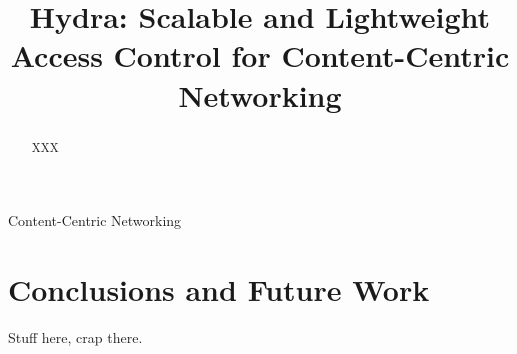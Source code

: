 \documentclass[conference]{IEEEtran}
\begin{document}
\title{Hydra: Scalable and Lightweight Access Control for Content-Centric Networking}

\author{
}

\maketitle

\begin{abstract}
XXX
\end{abstract}

\begin{IEEEkeywords}
Content-Centric Networking
\end{IEEEkeywords}

\IEEEpeerreviewmaketitle





\section{Conclusions and Future Work}\label{sec:conclusion}
Stuff here, crap there.

\ifCLASSOPTIONcaptionsoff
  \newpage
\fi

\tiny

%
%

\end{document}

